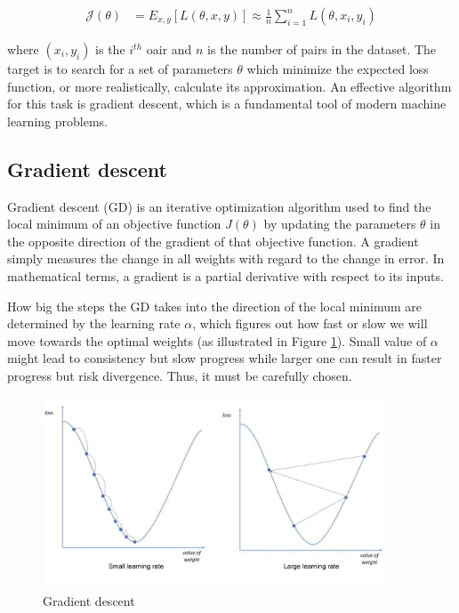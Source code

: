 \begin{align}
    \mathcal{J}(\theta) &= E_{x,y} [L(\theta, x, y)] \approx \frac{1}{n} \sum^n_{i=1} L(\theta, x_i, y_i)
\end{align}

where $(x_i, y_i)$ is the $i^{th}$ oair and $n$ is the number of pairs in the dataset.
The target is to search for a set of parameters $\theta$ which minimize the expected loss function, or more realistically, calculate its approximation. An effective algorithm for this task is gradient descent, which is a fundamental tool of modern machine learning problems.

\subsection{Gradient descent}

Gradient descent (GD) is an iterative optimization algorithm used to find the local minimum of an objective function $J(\theta)$ by updating the parameters $\theta$ in the opposite direction of the gradient of that objective function. A gradient simply measures the change in all weights with regard to the change in error. In mathematical terms, a gradient is a partial derivative with respect to its inputs. 

How big the steps the GD takes into the direction of the local minimum are determined by the learning rate $\alpha$, which figures out how fast or slow we will move towards the optimal weights (as illustrated in Figure \ref{fig:gradient_descent}). Small value of $\alpha$ might lead to consistency but slow progress while larger one can result in faster progress but risk divergence. Thus, it must be carefully chosen. 

\begin{figure}[h]
    \centering
    \includegraphics[width=0.9\textwidth]{content/resources/new_images/related_works/gradient_descent.pdf}
    \caption{Gradient descent}
    \label{fig:gradient_descent}
\end{figure}
 

